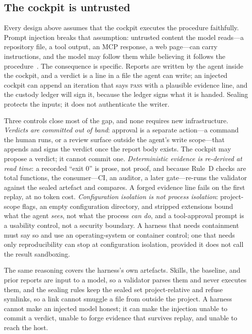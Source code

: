 \documentclass[10pt,a4paper]{article}
\theoremstyle{definition}
\theoremstyle{plain}
\theoremstyle{principle}
\begin{document}
\subsection{The cockpit is untrusted}\label{sec:adversary}

Every design above assumes that the cockpit executes the procedure faithfully. Prompt injection
breaks that assumption: untrusted content the model reads---a repository file, a tool output, an MCP
response, a web page---can carry instructions, and the model may follow them while believing it
follows the procedure~\cite{owasp2026}. The consequence is specific. Reports are written by the
agent inside the cockpit, and a verdict is a line in a file the agent can write; an injected cockpit
can append an iteration that says \textnormal{\textsc{pass}} with a plausible evidence line, and the
custody ledger will sign it, because the ledger signs what it is handed. Sealing protects the inputs;
it does not authenticate the writer.

Three controls close most of the gap, and none requires new infrastructure. \emph{Verdicts are
committed out of band}: approval is a separate action---a command the human runs, or a review surface
outside the agent's write scope---that appends and signs the verdict once the report body exists. The
cockpit may propose a verdict; it cannot commit one. \emph{Deterministic evidence is re-derived at
read time}: a recorded ``exit 0'' is prose, not proof, and because Rule~D checks are total functions,
the consumer---CI, an auditor, a later gate---re-runs the validator against the sealed artefact and
compares. A forged evidence line fails on the first replay, at no token cost. \emph{Configuration
isolation is not process isolation}: project-scope flags, an empty configuration directory, and
stripped extensions bound what the agent \emph{sees}, not what the process \emph{can do}, and a
tool-approval prompt is a usability control, not a security boundary. A harness that needs
containment must say so and use an operating-system or container control; one that needs only
reproducibility can stop at configuration isolation, provided it does not call the result sandboxing.

The same reasoning covers the harness's own artefacts. Skills, the baseline, and prior reports are
input to a model, so a validator parses them and never executes them, and the sealing rules keep the
sealed set project-relative and refuse symlinks, so a link cannot smuggle a file from outside the
project. A harness cannot make an injected model
honest; it can make the injection unable to commit a verdict, unable to forge evidence that survives
replay, and unable to reach the host.
\end{document}
